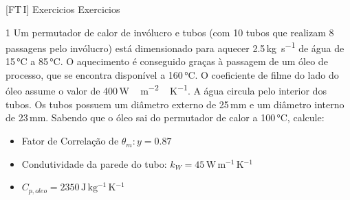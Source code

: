 \documentclass[\mainfilename]{subfiles}
\begin{document}
[FT\,I]
{Exercicios}
{Exercicios}

\setcounter{question}{2}

\begin{questionBox}1{ %
    Um permutador de calor de invólucro e tubos (com 10 tubos que realizam 8 passagens pelo invólucro) está dimensionado para aquecer 2.5\,\unit{\kilo\gram\per\second} de água de 15\,\unit{\celsius} a 85\,\unit{\celsius}. O aquecimento é conseguido graças à passagem de um óleo de processo, que se encontra disponível a 160\,\unit{\celsius}. O coeficiente de filme do lado do óleo assume o valor de 400\,\unit{\watt\,\metre^{-2}\,\kelvin^{-1}}. A água circula pelo interior dos tubos. Os tubos possuem um diâmetro externo de 25\,\unit{\milli\metre} e um diâmetro interno de 23\,\unit{\milli\metre}. Sabendo que o óleo sai do permutador de calor a 100\,\unit{\celsius}, calcule:
} %
    \vspace{-3ex}
    \begin{itemize}
        \item Fator de Correlação de \(\theta_m:y=0.87\)
        \item Condutividade da parede do tubo: \(k_W=45\,\unit{\watt\,\metre^{-1}\,\kelvin^{-1}}\)
        \item \(C_{p,oleo}=2350\,\unit{\joule\,\kilo\gram^{-1}\,\kelvin^{-1}}\)
    \end{itemize}

\end{questionBox}
\end{document}
